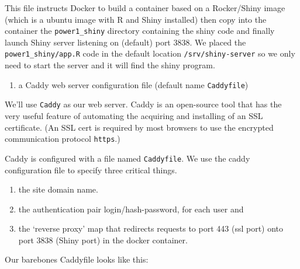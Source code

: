 \documentclass[
  letterpaper,
  DIV=11,
  numbers=noendperiod,
  oneside]{scrartcl}
\newenvironment{Shaded}{\begin{snugshade}}{\end{snugshade}}
\newcommand{\DecValTok}[1]{\textcolor[rgb]{0.68,0.00,0.00}{#1}}
\newcommand{\ErrorTok}[1]{\textcolor[rgb]{0.68,0.00,0.00}{#1}}
\newcommand{\FloatTok}[1]{\textcolor[rgb]{0.68,0.00,0.00}{#1}}
\newcommand{\NormalTok}[1]{\textcolor[rgb]{0.00,0.23,0.31}{#1}}
\newcommand{\SpecialCharTok}[1]{\textcolor[rgb]{0.37,0.37,0.37}{#1}}
\providecommand{\tightlist}{%
  \setlength{\itemsep}{0pt}\setlength{\parskip}{0pt}}\usepackage{longtable,booktabs,array}
\begin{document}
This file instructs Docker to build a container based on a Rocker/Shiny
image (which is a ubuntu image with R and Shiny installed) then copy
into the container the \texttt{power1\_shiny} directory containing the
shiny code and finally launch Shiny server listening on (default) port
3838. We placed the \texttt{power1\_shiny/app.R} code in the default
location \texttt{/srv/shiny-server} so we only need to start the server
and it will find the shiny program.

\begin{enumerate}
\def\labelenumi{\arabic{enumi}.}
\setcounter{enumi}{1}
\tightlist
\item
  a Caddy web server configuration file (default name
  \texttt{Caddyfile})
\end{enumerate}

We'll use \texttt{Caddy} as our web server. Caddy is an open-source tool
that has the very useful feature of automating the acquiring and
installing of an SSL certificate. (An SSL cert is required by most
browsers to use the encrypted communication protocol \texttt{https}.)

Caddy is configured with a file named \texttt{Caddyfile}. We use the
caddy configuration file to specify three critical things.

\begin{enumerate}
\def\labelenumi{\arabic{enumi}.}
\tightlist
\item
  the site domain name.
\item
  the authentication pair login/hash-password, for each user and
\item
  the `reverse proxy' map that redirects requests to port 443 (ssl port)
  onto port 3838 (Shiny port) in the docker container.
\end{enumerate}

Our barebones Caddyfile looks like this:

\begin{Shaded}
\end{Shaded}
\end{document}
